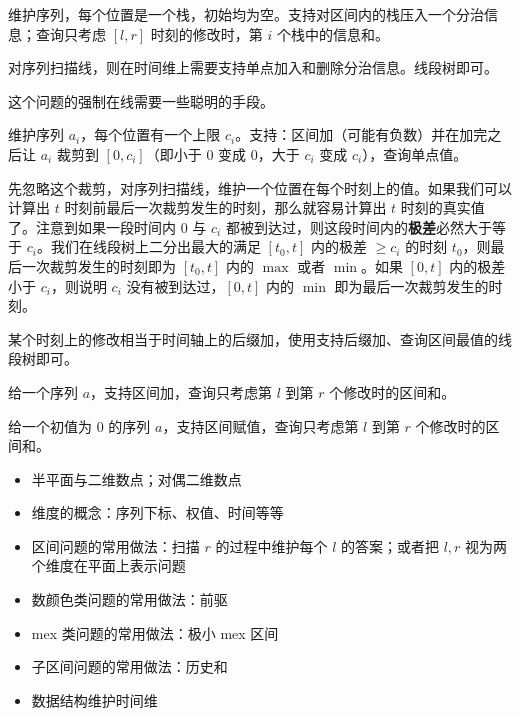 \begin{example}
    维护序列，每个位置是一个栈，初始均为空。支持对区间内的栈压入一个分治信息；查询只考虑 $[l,r]$ 时刻的修改时，第 $i$ 个栈中的信息和。
\end{example}
\begin{solution}
    对序列扫描线，则在时间维上需要支持单点加入和删除分治信息。线段树即可。
\end{solution}
\begin{remark}
    这个问题的强制在线需要一些聪明的手段。
\end{remark}
\begin{example}
    维护序列 $a_i$，每个位置有一个上限 $c_i$。支持：区间加（可能有负数）并在加完之后让 $a_i$ 裁剪到 $[0,c_i]$（即小于 $0$ 变成 $0$，大于 $c_i$ 变成 $c_i$），查询单点值。
\end{example}
\begin{solution}
    先忽略这个裁剪，对序列扫描线，维护一个位置在每个时刻上的值。如果我们可以计算出 $t$ 时刻前最后一次裁剪发生的时刻，那么就容易计算出 $t$ 时刻的真实值了。注意到如果一段时间内 $0$ 与 $c_i$ 都被到达过，则这段时间内的\textbf{极差}必然大于等于 $c_i$。我们在线段树上二分出最大的满足 $[t_0,t]$ 内的极差 $\ge c_i$ 的时刻 $t_0$，则最后一次裁剪发生的时刻即为 $[t_0,t]$ 内的 $\max$ 或者 $\min$。如果 $[0,t]$ 内的极差小于 $c_i$，则说明 $c_i$ 没有被到达过，$[0,t]$ 内的 $\min$ 即为最后一次裁剪发生的时刻。
    
    某个时刻上的修改相当于时间轴上的后缀加，使用支持后缀加、查询区间最值的线段树即可。
\end{solution}
\begin{exercise}[P7560]
\end{exercise}

\begin{example}
    给一个序列 $a$，支持区间加，查询只考虑第 $l$ 到第 $r$ 个修改时的区间和。
\end{example}
\begin{example}[P8512]
    给一个初值为 $0$ 的序列 $a$，支持区间赋值，查询只考虑第 $l$ 到第 $r$ 个修改时的区间和。
\end{example}

\begin{summary}
    \begin{itemize}
        \item 半平面与二维数点；对偶二维数点
        \item 维度的概念：序列下标、权值、时间等等
        \item 区间问题的常用做法：扫描 $r$ 的过程中维护每个 $l$ 的答案；或者把 $l,r$ 视为两个维度在平面上表示问题
        \item 数颜色类问题的常用做法：前驱
        \item mex 类问题的常用做法：极小 mex 区间
        \item 子区间问题的常用做法：历史和
        \item 数据结构维护时间维
    \end{itemize}
\end{summary}